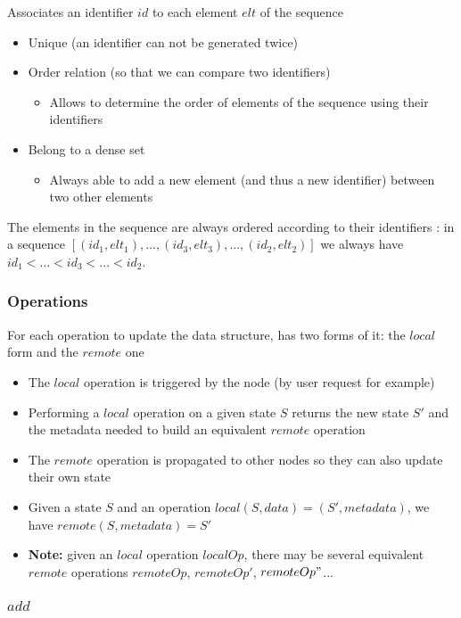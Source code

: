 \documentclass[a4paper]{article}
\begin{document}
Associates an identifier $id$ to each element $elt$ of the sequence
\begin{itemize}
  \item Unique (an identifier can not be generated twice)
  \item Order relation (so that we can compare two identifiers)
  \begin{itemize}
    \item Allows to determine the order of elements of the sequence using their identifiers
  \end{itemize}
  \item Belong to a dense set
  \begin{itemize}
    \item Always able to add a new element (and thus a new identifier) between two other elements
  \end{itemize}
\end{itemize}

The elements in the sequence are always ordered according to their identifiers :
in a sequence $[(id_1, elt_1), ..., (id_3, elt_3), ..., (id_2, elt_2)]$
we always have $id_1 < ... < id_3 < ... < id_2$.

\subsubsection{Operations}

For each operation to update the data structure, has two forms of it: the $local$ form and the $remote$ one
\begin{itemize}
  \item The $local$ operation is triggered by the node (by user request for example)
  \item Performing a $local$ operation on a given state $S$
    returns the new state $S'$ and the metadata needed to build an equivalent $remote$ operation
  \item The $remote$ operation is propagated to other nodes so they can also update their own state
  \item Given a state $S$ and an operation $local(S, data) = (S', metadata)$, we have $remote(S, metadata) = S'$
  \item \textbf{Note: } given an $local$ operation $localOp$, there may be several equivalent $remote$ operations $remoteOp$, $remoteOp'$, $remoteOp"$...
\end{itemize}

\subsubsection{$add$}
\end{document}
